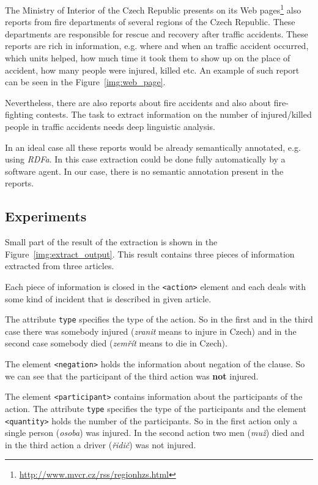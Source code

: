 The Ministry of Interior of the Czech Republic presents on its Web pages\footnote{\url{http://www.mvcr.cz/rss/regionhzs.html}} also reports from fire departments of several regions of the Czech Republic. These departments are responsible for rescue and recovery after traffic accidents. These reports are rich in information, e.g. where and when an traffic accident occurred, which units helped, how much time it took them to show up on the place of accident, how many people were injured, killed etc. An example of such report can be seen in the Figure~\ref{img:web_page}.


Nevertheless, there are also reports about fire accidents and also about fire-fighting contests. The task to extract information on the number of injured/killed people in traffic accidents needs deep linguistic analysis.


In an ideal case all these reports would be already semantically annotated, e.g. using \emph{RDFa}. In this case extraction could be done fully automatically by a software agent. In our case, there is no semantic annotation present in the reports.


\subsection{Experiments}

Small part of the result of the extraction is shown in the Figure~\ref{img:extract_output}. This result contains three pieces of information extracted from three articles.

Each piece of information is closed in the \verb+<action>+ element and each deals with some kind of incident that is described in given article.

The attribute \verb+type+ specifies the type of the action. So in the first and in the third case there was somebody injured (\emph{zranit} means to injure in Czech) and in the second case somebody died (\emph{zemřít} means to die in Czech).

The element \verb+<negation>+ holds the information about negation of the clause. So we can see that the participant of the third action was \textbf{not} injured.

The element \verb+<participant>+ contains information about the participants of the action. The attribute \verb+type+ specifies the type of the participants and the element \verb+<quantity>+ holds the number of the participants. So in the first action only a single person (\emph{osoba}) was injured. In the second action two men (\emph{muž}) died and in the third action a driver (\emph{řidič}) was not injured.
